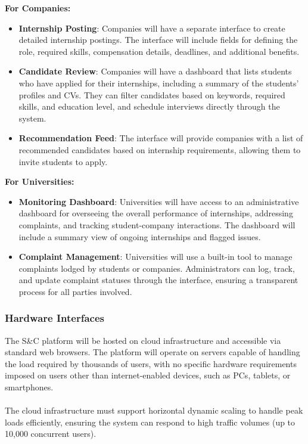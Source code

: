 \vspace{5mm}
\textbf{For Companies:}
\begin{itemize}
    \item \textbf{Internship Posting}: Companies will have a separate interface to create detailed internship postings. The interface will include fields for defining the role, required skills, compensation details, deadlines, and additional benefits.
    \item \textbf{Candidate Review}: Companies will have a dashboard that lists students who have applied for their internships, including a summary of the students' profiles and CVs. They can filter candidates based on keywords, required skills, and education level, and schedule interviews directly through the system. 
    \item \textbf{Recommendation Feed}: The interface will provide companies with a list of recommended candidates based on internship requirements, allowing them to invite students to apply.
\end{itemize} 
\vspace{5mm}
\textbf{For Universities:}
\begin{itemize}
    \item \textbf{Monitoring Dashboard}: Universities will have access to an administrative dashboard for overseeing the overall performance of internships, addressing complaints, and tracking student-company interactions. The dashboard will include a summary view of ongoing internships and flagged issues.
    \item \textbf{Complaint Management}: Universities will use a built-in tool to manage complaints lodged by students or companies. Administrators can log, track, and update complaint statuses through the interface, ensuring a transparent process for all parties involved.
\end{itemize}

\subsubsection{Hardware Interfaces}

The S\&C platform will be hosted on cloud infrastructure and accessible via standard web browsers. The platform will operate on servers capable of handling the load required by thousands of users, with no specific hardware requirements imposed on users other than internet-enabled devices, such as PCs, tablets, or smartphones.\\ \\
The cloud infrastructure must support horizontal dynamic scaling to handle peak loads efficiently, ensuring the system can respond to high traffic volumes (up to 10,000 concurrent users).

